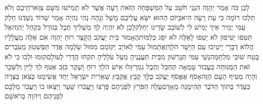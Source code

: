 \documentclass[../main/main.tex]{subfiles}
\begin{document}
\begin{multicols*}{\ncols}
לָכֵן כֹּה אָמַר יַהְוֶה הִנְנִי חֹשֵׁב עַל הַמִּשְׁפָּחָה הַזֹּאת רָעָה אֲשֶׁר לֹא תָמִישׁוּ מִשָּׁם צַוְּארֹתֵיכֶם וְלֹא תֵלְכוּ רוֹמָה כִּי עֵת רָעָה הִיא\PreVerseSpace{}בַּיּוֹם הַהוּא יִשָּׂא עֲלֵיכֶם מָשָׁל וְנָהָה נְהִי נִהְיָה אָמַר שָׁדוֹד נְשַׁדֻּנוּ חֵלֶק עַמִּי יָמִיר אֵיךְ יָמִישׁ לִי לְשׁוֹבֵב שָׂדֵינוּ יְחַלֵּק\PreVerseSpace{}לָכֵן לֹא יִהְיֶה לְךָ מַשְׁלִיךְ חֶבֶל בְּגוֹרָל בִּקְהַל יַהְוֶה\PreVerseSpace{}אַל תַּטִּפוּ יַטִּיפוּן לֹא יַטִּפוּ לָאֵלֶּה לֹא יִסַּג כְּלִמּוֹת\PreVerseSpace{}הֶאָמוּר בֵּית יַעֲקֹב הֲקָצַר רוּחַ יַהְוֶה אִם אֵלֶּה מַעֲלָלָיו הֲלוֹא דְבָרַי יֵיטִיבוּ עִם הַיָּשָׁר הֹלֵךְ\PreVerseSpace{}וְאֶתְמוּל עַמִּי לְאוֹיֵב יְקוֹמֵם מִמּוּל שַׂלְמָה אֶדֶר תַּפְשִׁטוּן מֵעֹבְרִים בֶּטַח שׁוּבֵי מִלְחָמָה\PreVerseSpace{}נְשֵׁי עַמִּי תְּגָרְשׁוּן מִבֵּית תַּעֲנֻגֶיהָ מֵעַל עֹלָלֶיהָ תִּקְחוּ הֲדָרִי לְעוֹלָם\PreVerseSpace{}קוּמוּ וּלְכוּ כִּי לֹא זֹאת הַמְּנוּחָה בַּעֲבוּר טָמְאָה תְּחַבֵּל וְחֶבֶל נִמְרָץ\PreVerseSpace{}לוּ אִישׁ הֹלֵךְ רוּחַ וָשֶׁקֶר כִּזֵּב אַטִּף לְךָ לַיַּיִן וְלַשֵּׁכָר וְהָיָה מַטִּיף הָעָם הַזֶּה\PreVerseSpace{}אָסֹף אֶאֱסֹף יַעֲקֹב כֻּלָּךְ קַבֵּץ אֲקַבֵּץ שְׁאֵרִית יִשְׂרָאֵל יַחַד אֲשִׂימֶנּוּ כְּצֹאן בַּצִּרָה\SubEnd{} כְּעֵדֶר בְּתוֹךְ הַדֹּבֶר\SubEnd{} תְּהִימֶנָה מֵאָדָם\PreVerseSpace{}עָלָה הַפֹּרֵץ לִפְנֵיהֶם פָּרְצוּ וַיַּעֲבֹרוּ שַׁעַר וַיֵּצְאוּ בוֹ וַיַּעֲבֹר מַלְכָּם לִפְנֵיהֶם וַיהוָה בְּרֹאשָׁם\OpenSection{}\par

\end{multicols*}
\end{document}
